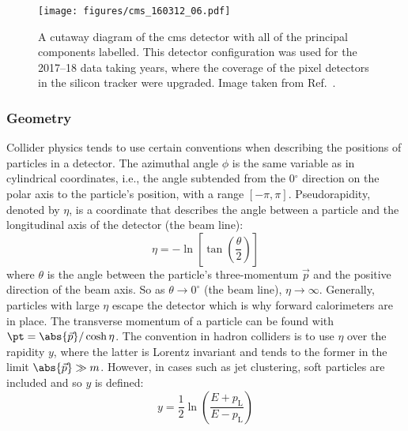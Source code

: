 \begin{figure}[htbp]
    \centering
    \texttt{[image: figures/cms\_160312\_06.pdf]}
    \caption[A cutaway diagram of the CMS detector with all of the principal components labelled. This detector configuration was used for the 2017--18 data taking years]{A cutaway diagram of the \acrshort{cms} detector with all of the principal components labelled. This detector configuration was used for the 2017--18 data taking years, where the coverage of the pixel detectors in the silicon tracker were upgraded. Image taken from Ref.~.}
    \label{fig:detector_cms_cutaway}
\end{figure}




\subsubsection{Geometry}
\label{subsubsec:geometry}

Collider physics tends to use certain conventions when describing the positions of particles in a detector. The azimuthal angle $\phi$ is the same variable as in cylindrical coordinates, i.e., the angle subtended from the 0$^{\circ}$ direction on the polar axis to the particle's position, with a range $[-\pi, \pi]$. Pseudorapidity, denoted by $\eta$, is a coordinate that describes the angle between a particle and the longitudinal axis of the detector (the beam line):
\begin{equation}
    \eta = -\ln \left[ \tan(\frac{\theta}{2}) \right]
    \label{eq:eta_def}
\end{equation}
where $\theta$ is the angle between the particle's three-momentum $\vec{p}$ and the positive direction of the beam axis. So as $\theta \rightarrow \text{0}^{\circ}$ (the beam line), $\eta \rightarrow \infty$. Generally, particles with large $\eta$ escape the detector which is why forward calorimeters are in place. The transverse momentum of a particle can be found with $\pt = \abs{\vec{p}} / \cosh \eta$. The convention in hadron colliders is to use $\eta$ over the rapidity $y$, where the latter is Lorentz invariant and tends to the former in the limit $\abs{\vec{p}} \gg m$. However, in cases such as jet clustering, soft particles are included and so $y$ is defined:
\begin{equation}
    y = \frac{1}{2} \ln (\frac{ E + p_{\mathrm{L}} }{ E - p_{\mathrm{L}} })
    \label{eq:rapidity_def}
\end{equation}

